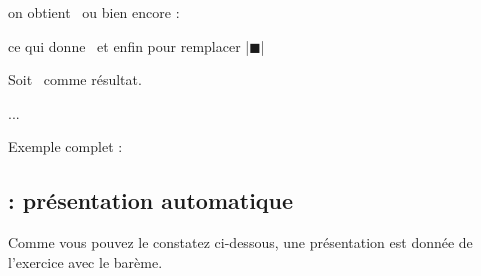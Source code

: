 \begin{tkzexample}
 \newcommand*{\altersquare}{\vbox{\hrule\hbox to 6pt%
 {\vrule height 5.2pt \hfil\vrule}\hrule}}\end{tkzexample}

\medskip on obtient \altersquare\ ou bien encore :

\begin{tkzexample}
 \newcommand*{\dingsquare}{\ding{114}} \end{tkzexample}

\medskip ce qui donne \dingsquare\ et enfin pour remplacer |$\blacksquare$| 

\begin{tkzexample}
 \newcommand*{\dingchecksquare}{\mbox{\ding{114}%
 \hspace{-.7em}\raisebox{.2ex}[1ex]{\ding{51}}}} \end{tkzexample}

\medskip Soit \dingchecksquare\ comme résultat. 


\begin{tkzexample} 

 \begin{alterqcm}[lq=90mm,symb=\altersquare]
 ... \end{alterqcm}\end{tkzexample}

\medskip
Exemple complet :

\medskip
\begin{tkzexample}[vbox]
 \begin{alterqcm}[VF,lq=125mm,symb    = \dingsquare]
 \AQquestion{Pour tout $x \in ]-3~;~2],~f'(x) \geqslant 0$.}
 \end{alterqcm}\end{tkzexample}
  

\subsection{ : présentation automatique }
Comme vous pouvez le constatez ci-dessous, une présentation est donnée de l'exercice avec le barème.

